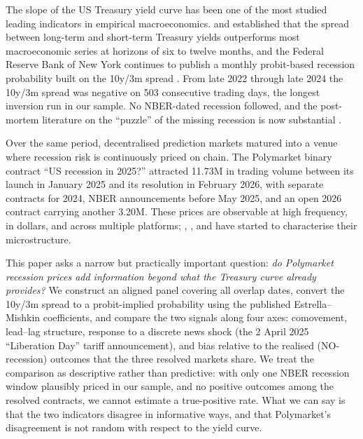 \documentclass{article}
\begin{document}
The slope of the US Treasury yield curve has been one of the most studied leading indicators in empirical macroeconomics. \citet{estrella1991term} and \citet{estrella1998predicting} established that the spread between long-term and short-term Treasury yields outperforms most macroeconomic series at horizons of six to twelve months, and the Federal Reserve Bank of New York continues to publish a monthly probit-based recession probability built on the 10y/3m spread \citep{estrella2006yieldcurve,nyfed_yieldcurve}. From late 2022 through late 2024 the 10y/3m spread was negative on 503 consecutive trading days, the longest inversion run in our sample. No NBER-dated recession followed, and the post-mortem literature on the ``puzzle'' of the missing recession is now substantial \citep{bauer2018information,engstrom2019near}.

Over the same period, decentralised prediction markets matured into a venue where recession risk is continuously priced on chain. The Polymarket binary contract ``US recession in 2025?'' attracted \textdollar 11.73M in trading volume between its launch in January 2025 and its resolution in February 2026, with separate contracts for 2024, NBER announcements before May 2025, and an open 2026 contract carrying another \textdollar 3.20M. These prices are observable at high frequency, in dollars, and across multiple platforms; \citet{tsang2026anatomy}, \citet{clinton2025prediction}, and \citet{dubach2026anatomy} have started to characterise their microstructure.

This paper asks a narrow but practically important question: \emph{do Polymarket recession prices add information beyond what the Treasury curve already provides?} We construct an aligned panel covering all overlap dates, convert the 10y/3m spread to a probit-implied probability using the published Estrella--Mishkin coefficients, and compare the two signals along four axes: comovement, lead--lag structure, response to a discrete news shock (the 2 April 2025 ``Liberation Day'' tariff announcement), and bias relative to the realised (NO-recession) outcomes that the three resolved markets share. We treat the comparison as descriptive rather than predictive: with only one NBER recession window plausibly priced in our sample, and no positive outcomes among the resolved contracts, we cannot estimate a true-positive rate. What we can say is that the two indicators disagree in informative ways, and that Polymarket's disagreement is not random with respect to the yield curve.
\end{document}
